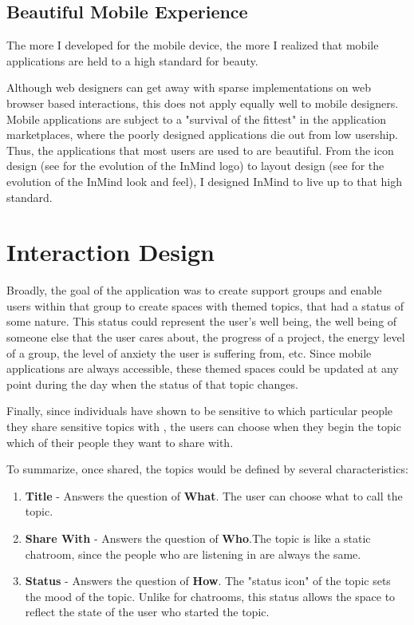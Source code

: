     \subsection{Beautiful Mobile Experience}
    The more I developed for the mobile device,
    the more I realized that mobile applications are held to a high standard for beauty.

    Although web designers can get away with sparse implementations on web browser based
    interactions,
    this does not apply equally well to mobile designers.
    Mobile applications are subject to a "survival of the fittest" in the application
    marketplaces, where the poorly designed applications die out from low usership.
    Thus, the applications that most users are used to are beautiful.
    From the icon design (see \cite{} for the evolution of the InMind logo)
    to layout design (see \cite{} for the evolution of the InMind look and feel),
    I designed InMind to live up to that high standard.

  \section{Interaction Design}
  Broadly, the goal of the application was to create support groups and 
  enable users within that group to create spaces
  with themed topics, that had a status of some nature.
  This status could represent the user's well being, the well being of someone else
  that the user cares about, the progress of a project, the energy level of a group,
  the level of anxiety the user is suffering from, etc.
  Since mobile applications are always accessible,
  these themed spaces could be updated at any point
  during the day when the status of that topic changes.

  Finally, since individuals have shown to be sensitive
  to which particular people they share
  sensitive topics with \cite{},
  the users can choose when they begin the topic
  which of their people they want to share with.

  To summarize, once shared, the topics would be defined by several characteristics:

  \begin{enumerate}
  \item \textbf{Title} - Answers the question of \textbf{What}. The user can choose what to call the topic.
  \item \textbf{Share With} - Answers the question of \textbf{Who}.The topic is like a static chatroom,
    since the people who are listening in are always the same.
  \item \textbf{Status} - Answers the question of \textbf{How}. The "status icon" of the topic sets the mood
    of the topic. Unlike for chatrooms,
    this status allows the space to reflect the state
    of the user who started the topic.
  \end{enumerate}

